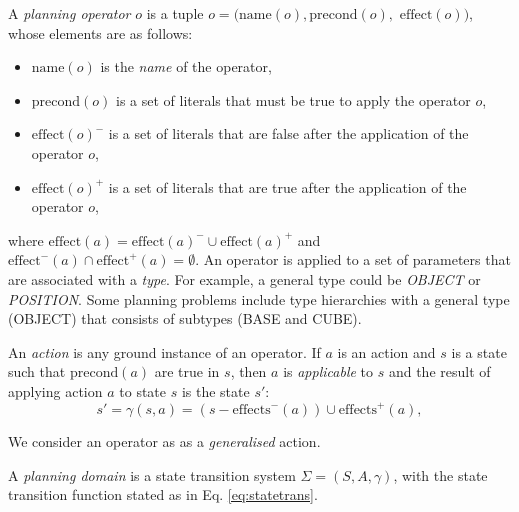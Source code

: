 \begin{definition}
A \textit{planning operator} $o$ is a tuple $o = (\text{name}(o), \text{precond}(o),$ $\text{effect}(o))$, whose elements are as follows:
\begin{itemize}
	\item $\text{name}(o)$ is the {\em name} of the operator,
	\item $\text{precond}(o)$ is a set of literals that must be true to apply the operator $o$,
	\item $\text{effect}(o)^{-}$ is a set of literals that are false after the application of the operator $o$,
	\item $\text{effect}(o)^{+}$ is a set of literals that are true after the application of the operator $o$,
\end{itemize}
\end{definition}
where $\text{effect}(a) = \text{effect}(a)^{-} \cup \text{effect}(a)^{+}$ and $\text{effect}^{-}(a) \cap \text{effect}^{+}(a) = \emptyset$. 
An operator is applied to a set of parameters that are associated with a \textit{type}.
For example, a general type could be \textit{OBJECT} or \textit{POSITION}.
Some planning problems include type hierarchies with a general type (\eg OBJECT) that consists of subtypes (\eg BASE and CUBE).

\begin{definition}
	An \textit{action} is any ground instance of an operator. 
	If $a$ is an action and $s$ is a state such that $\text{precond}(a)$ are true in $s$, then $a$ is {\em applicable} to $s$ and the result of applying action $a$ to state $s$ is the state $s'$:  
	\begin{equation}\label{eq:statetrans}
		s' = \gamma(s, a) = (s - \text{effects}^{-}(a)) \cup \text{effects}^{+}(a),
	\end{equation}
	
\end{definition}

We consider an operator as as a \textit{generalised} action.

\begin{definition}
A \textit{planning domain} is a state transition system $\Sigma = (S, A, \gamma)$, with the state transition function stated as in Eq. \ref{eq:statetrans}.
\end{definition}

